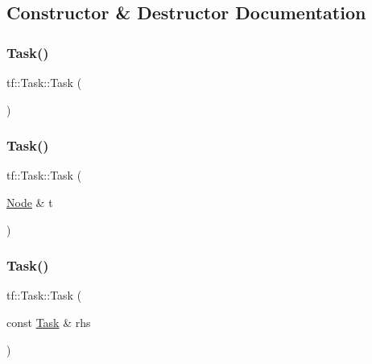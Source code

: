 \subsection{Constructor \& Destructor Documentation}
\mbox{\label{classtf_1_1Task_a5ed7ba63e8eeaa0f21fe08c80aa474ba}} 
\subsubsection{\texorpdfstring{Task()}{Task()}\hspace{0.1cm}{\footnotesize\ttfamily [1/4]}}
{\footnotesize\ttfamily tf\+::\+Task\+::\+Task (\begin{DoxyParamCaption}{ }\end{DoxyParamCaption})\hspace{0.3cm}{\ttfamily [default]}}

\mbox{\label{classtf_1_1Task_ac23878fa7fd15b212e80bcb51e69ce51}} 
\subsubsection{\texorpdfstring{Task()}{Task()}\hspace{0.1cm}{\footnotesize\ttfamily [2/4]}}
{\footnotesize\ttfamily tf\+::\+Task\+::\+Task (\begin{DoxyParamCaption}\item[{\hyperlink{classtf_1_1Node}{Node} \&}]{t }\end{DoxyParamCaption})\hspace{0.3cm}{\ttfamily [inline]}}

\mbox{\label{classtf_1_1Task_a46a1b01af926c0fa699c831073b45f1c}} 
\subsubsection{\texorpdfstring{Task()}{Task()}\hspace{0.1cm}{\footnotesize\ttfamily [3/4]}}
{\footnotesize\ttfamily tf\+::\+Task\+::\+Task (\begin{DoxyParamCaption}\item[{const \hyperlink{classtf_1_1Task}{Task} \&}]{rhs }\end{DoxyParamCaption})\hspace{0.3cm}{\ttfamily [inline]}}

